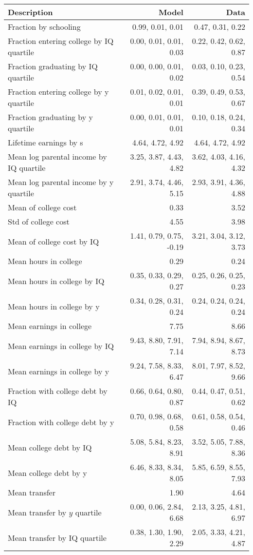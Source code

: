 \begin{tabular}{lrr}
\hline
Description & Model  & Data  \\
\hline
Fraction by schooling & 0.99, 0.01, 0.01  & 0.47, 0.31, 0.22  \\
Fraction entering college by IQ quartile & 0.00, 0.01, 0.01, 0.03  & 0.22, 0.42, 0.62, 0.87  \\
Fraction graduating by IQ quartile & 0.00, 0.00, 0.01, 0.02  & 0.03, 0.10, 0.23, 0.54  \\
Fraction entering college by y quartile & 0.01, 0.02, 0.01, 0.01  & 0.39, 0.49, 0.53, 0.67  \\
Fraction graduating by y quartile & 0.00, 0.01, 0.01, 0.01  & 0.10, 0.18, 0.24, 0.34  \\
Lifetime earnings by s & 4.64, 4.72, 4.92  & 4.64, 4.72, 4.92  \\
Mean log parental income by IQ quartile & 3.25, 3.87, 4.43, 4.82  & 3.62, 4.03, 4.16, 4.32  \\
Mean log parental income by y quartile & 2.91, 3.74, 4.46, 5.15  & 2.93, 3.91, 4.36, 4.88  \\
Mean of college cost & 0.33  & 3.52  \\
Std of college cost & 4.55  & 3.98  \\
Mean of college cost by IQ & 1.41, 0.79, 0.75, -0.19  & 3.21, 3.04, 3.12, 3.73  \\
Mean hours in college & 0.29  & 0.24  \\
Mean hours in college by IQ & 0.35, 0.33, 0.29, 0.27  & 0.25, 0.26, 0.25, 0.23  \\
Mean hours in college by y & 0.34, 0.28, 0.31, 0.24  & 0.24, 0.24, 0.24, 0.24  \\
Mean earnings in college & 7.75  & 8.66  \\
Mean earnings in college by IQ & 9.43, 8.80, 7.91, 7.14  & 7.94, 8.94, 8.67, 8.73  \\
Mean earnings in college by y & 9.24, 7.58, 8.33, 6.47  & 8.01, 7.97, 8.52, 9.66  \\
Fraction with college debt by IQ & 0.66, 0.64, 0.80, 0.87  & 0.44, 0.47, 0.51, 0.62  \\
Fraction with college debt by y & 0.70, 0.98, 0.68, 0.58  & 0.61, 0.58, 0.54, 0.46  \\
Mean college debt by IQ & 5.08, 5.84, 8.23, 8.91  & 3.52, 5.05, 7.88, 8.36  \\
Mean college debt by y & 6.46, 8.33, 8.34, 8.05  & 5.85, 6.59, 8.55, 7.93  \\
Mean transfer & 1.90  & 4.64  \\
Mean transfer by $y$ quartile & 0.00, 0.06, 2.84, 6.68  & 2.13, 3.25, 4.81, 6.97  \\
Mean transfer by IQ quartile & 0.38, 1.30, 1.90, 2.29  & 2.05, 3.33, 4.21, 4.87  \\
\hline
\end{tabular}%
